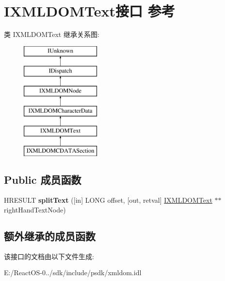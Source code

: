 \hypertarget{interface_i_x_m_l_d_o_m_text}{}\section{I\+X\+M\+L\+D\+O\+M\+Text接口 参考}
\label{interface_i_x_m_l_d_o_m_text}
类 I\+X\+M\+L\+D\+O\+M\+Text 继承关系图\+:\begin{figure}[H]
\begin{center}
\leavevmode
\includegraphics[height=6.000000cm]{interface_i_x_m_l_d_o_m_text}
\end{center}
\end{figure}
\subsection*{Public 成员函数}
\begin{DoxyCompactItemize}
\item 
\mbox{\label{interface_i_x_m_l_d_o_m_text_a37c4d0a2a11982cab4daef35c23db288}} 
H\+R\+E\+S\+U\+LT {\bfseries split\+Text} (\mbox{[}in\mbox{]} L\+O\+NG offset, \mbox{[}out, retval\mbox{]} \hyperlink{interface_i_x_m_l_d_o_m_text}{I\+X\+M\+L\+D\+O\+M\+Text} $\ast$$\ast$right\+Hand\+Text\+Node)
\end{DoxyCompactItemize}
\subsection*{额外继承的成员函数}


该接口的文档由以下文件生成\+:\begin{DoxyCompactItemize}
\item 
E\+:/\+React\+O\+S-\/0../sdk/include/psdk/xmldom.\+idl\end{DoxyCompactItemize}
